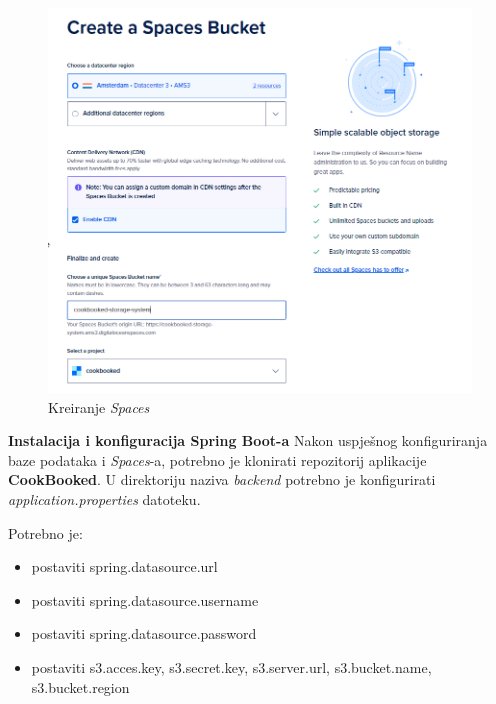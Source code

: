 			\begin{figure}[H]
				\includegraphics[scale=0.4]{slike/spaces_bucket.png}
				\centering
				\caption{Kreiranje \textit{Spaces}}
				\label{fig:createspaces}
			\end{figure}
			
			\eject
			\noindent \textbf{Instalacija i konfiguracija Spring Boot-a}
			\noindent Nakon uspješnog konfiguriranja baze podataka i \textit{Spaces}-a, potrebno je klonirati repozitorij
			aplikacije \textbf{CookBooked}. U direktoriju naziva \textit{backend} potrebno je konfigurirati
			\textit{application.properties} datoteku.

			Potrebno je:

			\begin{itemize}
				\item postaviti spring.datasource.url
				\item postaviti spring.datasource.username
				\item postaviti spring.datasource.password
				\item postaviti s3.acces.key, s3.secret.key, s3.server.url, s3.bucket.name, s3.bucket.region
			\end{itemize}

